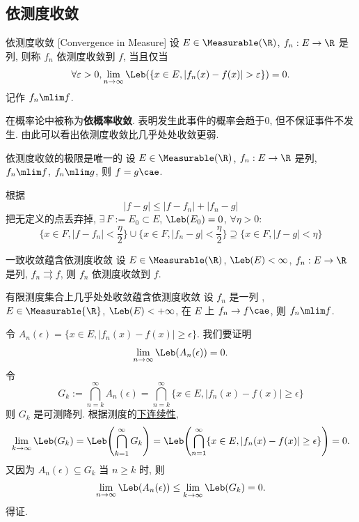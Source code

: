 \subsection{依测度收敛}
\begin{dfn}
    {依测度收敛}
    [Convergence in Measure]
    设 $E\in\Measurable(\R)$, \(f_n:E\to\R\) 是\MeasurableFunc{}列, 则称 \(f_n\) 依测度收敛到 \(f\), 当且仅当 
    \[\forall\varepsilon>0, \lim_{n\to\infty} \Leb(\{x\in E, |f_n(x)-f(x)|>\varepsilon\})=0.\]
    记作 \(f_n\mlim f\).
\end{dfn}
\begin{rmk}
    在概率论中被称为\textbf{依概率收敛}. 表明发生此事件的概率会趋于0, 但不保证事件不发生. 由此可以看出依测度收敛比几乎处处收敛更弱.
\end{rmk}
\begin{ppt}
    {依测度收敛的极限是唯一的}
    设 $E\in\Measurable(\R)$, \(f_n:E\to\R\) 是\MeasurableFunc{}列, \(f_n\mlim f\), \(f_n\mlim g\), 则 \(f=g\cae\).
\end{ppt}
\begin{prf}
    根据 
    \[|f-g|\leq |f-f_n|+|f_n-g|\]
    把无定义的点丢弃掉, 
    \(\exists\,F:=E_0\subset E\), \(\Leb(E_0)=0\), \(\forall\eta>0\):
    \[\{x\in F, |f-f_n|<\frac{\eta}{2}  \}\cup\{x\in F, |f_n-g|<\frac{\eta}{2} \}\supseteq \{x\in F, |f-g|<\eta \} \]
\end{prf}
\begin{ppt}
    {一致收敛蕴含依测度收敛}
    设 $E\in\Measurable(\R)$, \(\Leb(E)<\infty\), \(f_n:E\to\R\) 是\MeasurableFunc{}列, \(f_n\rightrightarrows f\), 则 \(f_n\) 依测度收敛到 \(f\).
\end{ppt}
\begin{ppt}
    {有限测度集合上几乎处处收敛蕴含依测度收敛}
    设 \(f_n\) 是一列 \MeasurableFunc{}, \(E\in\Measurable{\R}\), \(\Leb(E)<+\infty\), 在 \(E\) 上 \(f_n\to f\cae\), 则 \(f_n\mlim f\).
\end{ppt}
\begin{prf}
    令 \(A_n(\epsilon)=\{x\in E, |f_n(x)-f(x)|\geq\epsilon\}\). 我们要证明 
    \[\lim_{n\to\infty}\Leb(A_n(\epsilon))=0.\]
    令
    \[G_k:=\bigcap_{n=k}^{\infty}A_n(\epsilon)=\bigcap_{n=k}^{\infty}\{x\in E, |f_n(x)-f(x)|\geq\epsilon \} \]
    则 \(G_k\) 是可测降列. 根据测度的\hyperref[ppt:measure-continuity-below]{下连续性}, 
    \[\lim_{k\to\infty}\Leb(G_k)=\Leb\qty(\bigcap_{k=1}^\infty G_k)=\Leb\qty(\bigcap_{n=1}^\infty \{x\in E, |f_n(x)-f(x)|\geq\epsilon \})=0.\]
    又因为 \(A_n(\epsilon)\subseteq G_k\) 当 \(n\geq k\) 时, 则 
    \[\lim_{n\to\infty}\Leb(A_n(\epsilon))\leq\lim_{k\to\infty}\Leb(G_k)=0.\]
    得证.
\end{prf}
